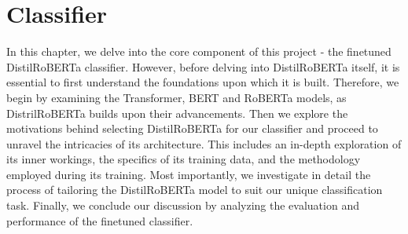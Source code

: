 \documentclass[a4paper,10pt]{report}
\begin{document}
\chapter{Classifier}
In this chapter, we delve into the core component of this project - the finetuned DistilRoBERTa classifier. However, before delving into DistilRoBERTa itself, it is essential to first understand the foundations upon which it is built. Therefore, we begin by examining the Transformer, BERT and RoBERTa models, as DistrilRoBERTa builds upon their advancements. Then we explore the motivations behind selecting DistilRoBERTa for our classifier and proceed to unravel the intricacies of its architecture. This includes an in-depth exploration of its inner workings, the specifics of its training data, and the methodology employed during its training. Most importantly, we investigate in detail the process of tailoring the DistilRoBERTa model to suit our unique classification task. Finally, we conclude our discussion by analyzing the evaluation and performance of the finetuned classifier.
\end{document}
